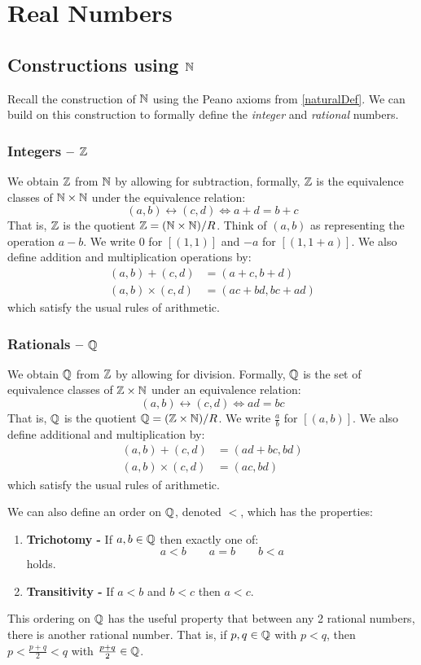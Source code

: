\documentclass[../main.tex]{subfiles}
\begin{document}
\chapter{Real Numbers}
\section{Constructions using \texorpdfstring{$\mathbb{N}$}{the naturals}}
Recall the construction of $\mathbb{N}$ using the Peano axioms from \cref{naturalDef}.
We can build on this construction to formally define the \textit{integer} and \textit{rational} numbers.
\subsection{Integers\texorpdfstring{ -- $\mathbb{Z}$}{}}
We obtain $\mathbb{Z}$ from $\mathbb{N}$ by allowing for subtraction, formally, $\mathbb{Z}$ is the equivalence classes of $\mathbb{N} \times \mathbb{N}$ under the equivalence relation:
\[
  (a, b) \rel (c, d) \iff a + d = b + c
\]
That is, $\mathbb{Z}$ is the quotient $\mathbb{Z} = (\mathbb{N} \times \mathbb{N}) / R$.
Think of $(a, b)$ as representing the operation $a - b$.
We write $0$ for $[(1, 1)]$ and $-a$ for $[(1, 1 + a)]$.
We also define addition and multiplication operations by:
\begin{align*}
  (a, b) + (c, d) &= (a + c, b + d) \\
  (a, b) \times (c, d) &= (ac + bd, bc + ad)
\end{align*}
which satisfy the usual rules of arithmetic.

\subsection{Rationals\texorpdfstring{ -- $\mathbb{Q}$}{}}
We obtain $\mathbb{Q}$ from $\mathbb{Z}$ by allowing for division.
Formally, $\mathbb{Q}$ is the set of equivalence classes of $\mathbb{Z} \times \mathbb{N}$ under an equivalence relation:
\[
  (a, b) \rel (c, d) \iff ad = bc
\]
That is, $\mathbb{Q}$ is the quotient $\mathbb{Q} = (\mathbb{Z} \times \mathbb{N}) / R$.
We write $\frac{a}{b}$ for $[(a, b)]$.
We also define additional and multiplication by:
\begin{align*}
  (a, b) + (c, d) &= (ad + bc, bd) \\
  (a, b) \times (c, d) &= (ac, bd)
\end{align*}
which satisfy the usual rules of arithmetic.

We can also define an order on $\mathbb{Q}$, denoted $<$, which has the properties:
\begin{enumerate}
  \item \textbf{Trichotomy -} If $a, b \in \mathbb{Q}$ then exactly one of:
    \[
      a < b \qquad a = b \qquad b < a
    \]
    holds.
  \item \textbf{Transitivity -} If $a < b$ and $b < c$ then $a < c$.
\end{enumerate}
This ordering on $\mathbb{Q}$ has the useful property that between any 2 rational numbers, there is another rational number.
That is, if $p, q \in \mathbb{Q}$ with $p < q$, then $p < \frac{p + q}{2} < q$ with $\frac{p + q}{2} \in \mathbb{Q}$.
\end{document}
